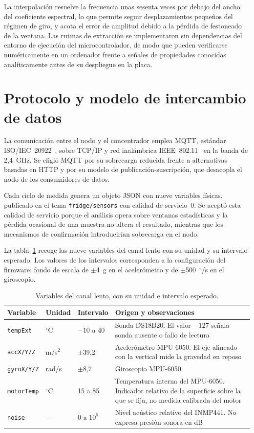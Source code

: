 La interpolación resuelve la frecuencia unas sesenta veces por debajo del ancho del
coeficiente espectral, lo que permite seguir desplazamientos pequeños del régimen de giro,
y acota el error de amplitud debido a la pérdida de festoneado de la ventana. Las rutinas de
extracción se implementaron sin dependencias del entorno de ejecución del microcontrolador,
de modo que pueden verificarse numéricamente en un ordenador frente a señales de
propiedades conocidas analíticamente antes de su despliegue en la placa.

\section{Protocolo y modelo de intercambio de datos}

La comunicación entre el nodo y el concentrador emplea MQTT, estándar
ISO/IEC~20922~\cite{isoiec20922}, sobre TCP/IP y red inalámbrica
IEEE~802.11~\cite{ieee80211} en la banda de \mbox{2,4 GHz}. Se eligió MQTT por su sobrecarga reducida frente a alternativas
basadas en HTTP y por su modelo de publicación-suscripción, que desacopla el nodo de los
consumidores de datos.

Cada ciclo de medida genera un objeto JSON con nueve variables físicas, publicado en el tema
\texttt{fridge/sensors} con calidad de servicio~0. Se aceptó esta calidad de servicio
porque el análisis opera sobre ventanas estadísticas y la pérdida ocasional de una muestra
no altera el resultado, mientras que los mecanismos de confirmación introducirían
sobrecarga en el nodo.

La tabla~\ref{table:variables} recoge las nueve variables del canal lento con su unidad y
su intervalo esperado. Los valores de los intervalos corresponden a la configuración del
firmware: fondo de escala de $\pm$\mbox{4 g} en el acelerómetro y de
$\pm$\mbox{500 $^\circ$/s} en el giroscopio.

\begin{table}[ht!]
\caption{Variables del canal lento, con su unidad e intervalo esperado.}
\label{table:variables}
\centering
\begin{tabular}{|p{2.1cm}|p{1.7cm}|p{2.4cm}|p{6.2cm}|}
\hline
\textbf{Variable} & \textbf{Unidad} & \textbf{Intervalo} & \textbf{Origen y observaciones} \\
\hline
\texttt{tempExt} & $^\circ$C & $-10$ a 40 & Sonda DS18B20. El valor $-127$ señala sonda
ausente o fallo de lectura \\
\hline
\texttt{accX/Y/Z} & m/s$^2$ & $\pm$39,2 & Acelerómetro MPU-6050. El eje alineado con la
vertical mide la gravedad en reposo \\
\hline
\texttt{gyroX/Y/Z} & rad/s & $\pm$8,7 & Giroscopio MPU-6050 \\
\hline
\texttt{motorTemp} & $^\circ$C & 15 a 85 & Temperatura interna del MPU-6050. Indicador
relativo de la superficie sobre la que se fija, no medida calibrada del motor \\
\hline
\texttt{noise} & --- & 0 a $10^5$ & Nivel acústico relativo del INMP441. No expresa
presión sonora en dB \\
\hline
\end{tabular}
\end{table}

